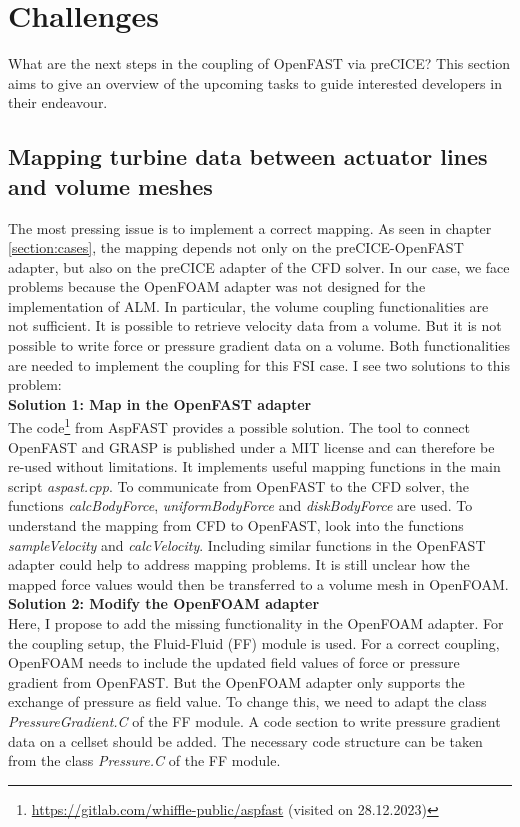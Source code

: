 \section{Challenges}
\label{section:challenges}

What are the next steps in the coupling of OpenFAST via preCICE? This section aims to give an overview of the upcoming tasks to guide interested developers in their endeavour. 

\subsection{Mapping turbine data between actuator lines and volume meshes}

The most pressing issue is to implement a correct mapping. As seen in chapter \ref{section:cases}, the mapping depends not only on the preCICE-OpenFAST adapter, but also on the preCICE adapter of the CFD solver. In our case, we face problems because the OpenFOAM adapter was not designed for the implementation of ALM. In particular, the volume coupling functionalities are not sufficient. It is possible to retrieve velocity data from a volume. But it is not possible to write force or pressure gradient data on a volume. Both functionalities are needed to implement the coupling for this FSI case. I see two solutions to this problem:\\
\textbf{Solution 1: Map in the OpenFAST adapter}\\
The code\footnote{\url{https://gitlab.com/whiffle-public/aspfast} (visited on 28.12.2023)} from AspFAST provides a possible solution. The tool to connect OpenFAST and GRASP is published under a MIT license and can therefore be re-used without limitations. It implements useful mapping functions in the main script \textit{aspast.cpp}. To communicate from OpenFAST to the CFD solver, the functions \textit{calcBodyForce}, \textit{uniformBodyForce} and \textit{diskBodyForce} are used. To understand the mapping from CFD to OpenFAST, look into the functions \textit{sampleVelocity} and \textit{calcVelocity}. Including similar functions in the OpenFAST adapter could help to address mapping problems. It is still unclear how the mapped force values would then be transferred to a volume mesh in OpenFOAM.\\
\textbf{Solution 2: Modify the OpenFOAM adapter}\\
Here, I propose to add the missing functionality in the OpenFOAM adapter. For the coupling setup, the Fluid-Fluid (FF) module is used. For a correct coupling, OpenFOAM needs to include the updated field values of force or pressure gradient from OpenFAST. But the OpenFOAM adapter only supports the exchange of pressure as field value. To change this, we need to adapt the class \textit{PressureGradient.C} of the FF module. A code section to write pressure gradient data on a cellset should be added. The necessary code structure can be taken from the class \textit{Pressure.C} of the FF module.

